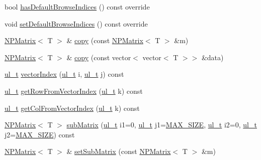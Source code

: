 \begin{DoxyCompactItemize}
\item 
bool \mbox{\hyperlink{class_n_p_matrix_a500e7eb470961e8c855ab52264a2c3be}{has\+Default\+Browse\+Indices}} () const override
\item 
void \mbox{\hyperlink{class_n_p_matrix_a58e138e518c03a4f9751fafdf7e43bcb}{set\+Default\+Browse\+Indices}} () const override
\item 
\mbox{\hyperlink{class_n_p_matrix}{N\+P\+Matrix}}$<$ T $>$ \& \mbox{\hyperlink{class_n_p_matrix_ad2420de13cf39828daf36fd74aea9d2d}{copy}} (const \mbox{\hyperlink{class_n_p_matrix}{N\+P\+Matrix}}$<$ T $>$ \&m)
\item 
\mbox{\hyperlink{class_n_p_matrix}{N\+P\+Matrix}}$<$ T $>$ \& \mbox{\hyperlink{class_n_p_matrix_aea56ed6b8852d53ddedce7d9f0ea5a08}{copy}} (const vector$<$ vector$<$ T $>$$>$ \&data)
\item 
\mbox{\hyperlink{typedef_8h_a1b140a2034db3f5dfe18a987745df43a}{ul\+\_\+t}} \mbox{\hyperlink{class_n_p_matrix_a1edc980b44c5b898ba3feb7d4f5ab625}{vector\+Index}} (\mbox{\hyperlink{typedef_8h_a1b140a2034db3f5dfe18a987745df43a}{ul\+\_\+t}} i, \mbox{\hyperlink{typedef_8h_a1b140a2034db3f5dfe18a987745df43a}{ul\+\_\+t}} j) const
\item 
\mbox{\hyperlink{typedef_8h_a1b140a2034db3f5dfe18a987745df43a}{ul\+\_\+t}} \mbox{\hyperlink{class_n_p_matrix_aa8f30ca3523d088186e8320f9e21b772}{get\+Row\+From\+Vector\+Index}} (\mbox{\hyperlink{typedef_8h_a1b140a2034db3f5dfe18a987745df43a}{ul\+\_\+t}} k) const
\item 
\mbox{\hyperlink{typedef_8h_a1b140a2034db3f5dfe18a987745df43a}{ul\+\_\+t}} \mbox{\hyperlink{class_n_p_matrix_a3ef7e9e257ba6119e369a9a3c633d35d}{get\+Col\+From\+Vector\+Index}} (\mbox{\hyperlink{typedef_8h_a1b140a2034db3f5dfe18a987745df43a}{ul\+\_\+t}} k) const
\item 
\mbox{\hyperlink{class_n_p_matrix}{N\+P\+Matrix}}$<$ T $>$ \mbox{\hyperlink{class_n_p_matrix_a1af1b395e03d5009666214eb7f954afb}{sub\+Matrix}} (\mbox{\hyperlink{typedef_8h_a1b140a2034db3f5dfe18a987745df43a}{ul\+\_\+t}} i1=0, \mbox{\hyperlink{typedef_8h_a1b140a2034db3f5dfe18a987745df43a}{ul\+\_\+t}} j1=\mbox{\hyperlink{_n_vector_8h_a0592dba56693fad79136250c11e5a7fe}{M\+A\+X\+\_\+\+S\+I\+ZE}}, \mbox{\hyperlink{typedef_8h_a1b140a2034db3f5dfe18a987745df43a}{ul\+\_\+t}} i2=0, \mbox{\hyperlink{typedef_8h_a1b140a2034db3f5dfe18a987745df43a}{ul\+\_\+t}} j2=\mbox{\hyperlink{_n_vector_8h_a0592dba56693fad79136250c11e5a7fe}{M\+A\+X\+\_\+\+S\+I\+ZE}}) const
\item 
\mbox{\hyperlink{class_n_p_matrix}{N\+P\+Matrix}}$<$ T $>$ \& \mbox{\hyperlink{class_n_p_matrix_a8165acb25f0b56c909cb4995824d3f76}{set\+Sub\+Matrix}} (const \mbox{\hyperlink{class_n_p_matrix}{N\+P\+Matrix}}$<$ T $>$ \&m)
$$
\end{DoxyCompactItemize}
